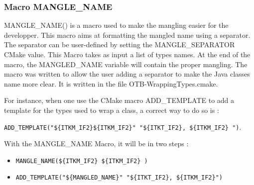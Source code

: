 \subsubsection{Macro MANGLE\_NAME}
MANGLE\_NAME() is a macro used to make the mangling easier for the developper. 
This macro aims at formatting the mangled name using a separator. The separator can be user-defined by
setting the MANGLE\_SEPARATOR CMake value. This Macro takes as input a  list of types names.
At the end of the macro, the MANGLED\_NAME variable will contain the proper mangling. 
The macro was written to allow the user adding a separator to make the Java classes name more clear.
It is written in the file OTB-WrappingTypes.cmake. 

For instance, when one use the CMake macro  ADD\_TEMPLATE to add a template 
for the types used to wrap a class, a correct way to do so is :

\verb!ADD_TEMPLATE("${ITKM_IF2}${ITKM_IF2}" "${ITKT_IF2}, ${ITKM_IF2} ")!.

With the MANGLE\_NAME Macro, it will be in two steps : 
\begin{itemize}
\item\verb!MANGLE_NAME(${ITKM_IF2} ${ITKM_IF2} )!
\item\verb!ADD_TEMPLATE("${MANGLED_NAME}" "${ITKT_IF2}, ${ITKM_IF2}")!
\end{itemize}







